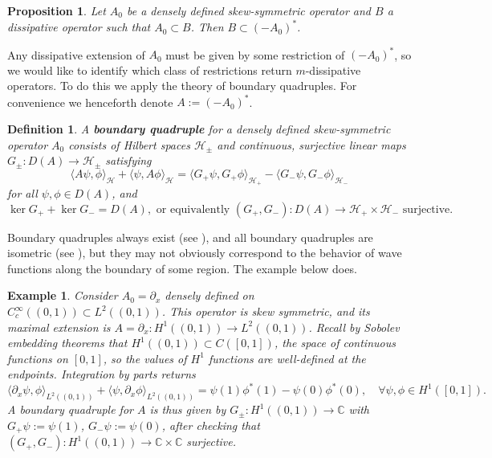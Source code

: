 \documentclass{article}
\numberwithin{equation}{section}
\newtheorem{example}{Example}[section]
\newtheorem{proposition}{Proposition}[section]
\newtheorem{definition}{Definition}[section]
\begin{document}
\begin{proposition}\label{Diss ext rest}\cite[Theorem 2.5]{Arendt2023}
    Let $A_0$ be a densely defined skew-symmetric operator and $B$ a dissipative operator such that $A_0 \subset B$. Then $B \subset (-A_0)^*$.
\end{proposition}
Any dissipative extension of $A_0$ must be given by some restriction of $(-A_0)^*$, so we would like to identify which class of restrictions return $m$-dissipative operators. To do this we apply the theory of boundary quadruples. For convenience we henceforth denote $A:=(-A_0)^*$.
\begin{definition}
    A \textbf{boundary quadruple} for a densely defined skew-symmetric operator $A_0$ consists of Hilbert spaces $\mathcal{H}_\pm$ and continuous, surjective linear maps $G_\pm: D(A)\to \mathcal{H}_\pm$ satisfying 
    \begin{equation}
        \langle A \psi, \phi \rangle_{\mathcal{H}} + \langle \psi, A \phi \rangle_{\mathcal{H}} = \langle G_+\psi, G_+ \phi \rangle_{\mathcal{H}_+} - \langle G_- \psi, G_- \phi \rangle_{\mathcal{\mathcal{H}_-}} 
    \end{equation}
    for all $\psi, \phi \in D(A)$, and 
    \begin{equation}
        \ker G_+ + \ker G_- = D(A), \text{ or equivalently } (G_+,G_-):D(A)\to \mathcal{H}_+ \times \mathcal{H}_- \text{ surjective}.
    \end{equation}
\end{definition}
Boundary quadruples always exist (see \cite[Example 3.6 and Example 3.7]{Arendt2023}), and all boundary quadruples are isometric (see \cite[Theorem 3.16]{Arendt2023}), but they may not obviously correspond to the behavior of wave functions along the boundary of some region. The example below does.
\begin{example}\label{One D Boundary Quad Example}
\em    Consider $A_0=\partial_x$ densely defined on $C_c^\infty((0,1))\subset L^2((0,1))$. This operator is skew symmetric, and its maximal extension is  $A=\partial_x :H^1((0,1))\to L^2((0,1))$. Recall by Sobolev embedding theorems \cite{Brezis} that $H^1((0,1))\subset C([0,1])$, the space of continuous functions on $[0,1]$, so the values of $H^1$ functions are well-defined at the endpoints. Integration by parts returns
    \begin{equation}
        \langle \partial_x \psi, \phi \rangle_{L^2((0,1))} + \langle \psi, \partial_x \phi \rangle_{L^2((0,1))} = \psi(1)\phi^*(1) - \psi(0)\phi^*(0), \quad \forall \psi, \phi \in H^1([0,1]).
    \end{equation}
    A boundary quadruple for $A$ is thus given by $G_\pm: H^1((0,1))\to \mathbb{C}$ with $G_+ \psi:= \psi(1)$, $G_-\psi:=\psi(0)$, after checking that $(G_+,G_-):H^1((0,1))\to \mathbb{C}\times \mathbb{C}$ surjective.
\end{example}
\end{document}
